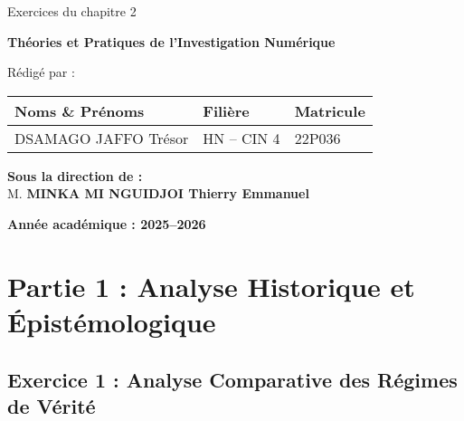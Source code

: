 \documentclass[12pt, a4paper]{article}
\begin{document}
\begin{titlepage}

	\vspace{1cm}

	{\Large Exercices du chapitre 2}

	\vspace{0.5cm}

	{\LARGE \textbf{Théories et Pratiques de l'Investigation Numérique}}

	\vspace{2cm}

	{\large Rédigé par :}

	\vspace{0.5cm}

	\begin{tabular}{|>{\centering\arraybackslash}m{8cm}
		|>{\centering\arraybackslash}m{4cm}
		|>{\centering\arraybackslash}m{3cm}|}
		\hline
		\textbf{Noms \& Prénoms} & \textbf{Filière} & \textbf{Matricule} \\
		\hline
		DSAMAGO JAFFO Trésor     & HN -- CIN 4      & 22P036             \\
		\hline
	\end{tabular}

	\vfill

	\begin{Large}
		\textbf{Sous la direction de :} \\
		M. \textbf{MINKA MI NGUIDJOI Thierry Emmanuel} \\
	\end{Large}

	\vspace{1cm}

	\textbf{Année académique : 2025--2026}
\end{titlepage}
\section*{Partie 1 : Analyse Historique et Épistémologique}

\subsection*{Exercice 1 : Analyse Comparative des Régimes de Vérité}
\end{document}
